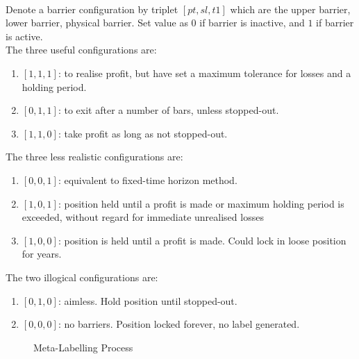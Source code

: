 \documentclass[a4paper,oneside,openany]{book}
\begin{document}
\begin{remark} \\
Denote a barrier configuration by triplet $[pt, sl, t1]$ which are the upper barrier, lower barrier, physical barrier. Set value as $0$ if barrier is inactive, and $1$ if barrier is active.\\
The three useful configurations are:
\begin{enumerate}[label=\roman*.]
\setlength{\itemsep}{0pt}
\item $[1,1,1]$: to realise profit, but have set a maximum tolerance for losses and a holding period.
\item $[0,1,1]$: to exit after a number of bars, unless stopped-out.
\item $[1,1,0]$: take profit as long as not stopped-out.
\end{enumerate}
The three less realistic configurations are:
\begin{enumerate}[label=\roman*.]
\setlength{\itemsep}{0pt}
\item $[0,0,1]$: equivalent to fixed-time horizon method. 
\item $[1,0,1]$: position held until a profit is made or maximum holding period is exceeded, without regard for immediate unrealised losses
\item $[1,0,0]$: position is held until a profit is made. Could lock in loose position for years.
\end{enumerate}
The two illogical configurations are:
\begin{enumerate}[label=\roman*.]
\setlength{\itemsep}{0pt}
\item $[0,1,0]$: aimless. Hold position until stopped-out.
\item $[0,0,0]$: no barriers. Position locked forever, no label generated.
\end{enumerate}
\end{remark}

\begin{figure}[H]
\centering
\scalebox{0.75}{}
\caption{Meta-Labelling Process}
\label{fig:metalabel}
\end{figure}
\end{document}

